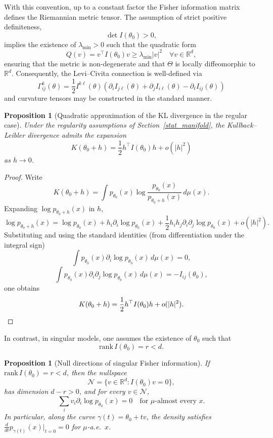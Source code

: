 \documentclass[11pt,letterpaper]{amsart}
\numberwithin{equation}{section}
\theoremstyle{plain}
\newtheorem{proposition}[theorem]{Proposition}
\theoremstyle{definition}
\theoremstyle{remark}
\begin{document}
With this convention, up to a constant factor the Fisher information matrix defines the Riemannian metric tensor. The assumption of strict positive definiteness,
\[
\det I(\theta_0) > 0,
\]
implies the existence of $\lambda_{\min} > 0$ such that the quadratic form
\[
Q(v) = v^\top I(\theta_0) v \geq \lambda_{\min} |v|^2 \quad \forall v \in \mathbb{R}^d,
\]
ensuring that the metric is non-degenerate and that $\Theta$ is locally diffeomorphic to $\mathbb{R}^d$. Consequently, the Levi--Civita connection is well-defined via
\[
\Gamma^k_{ij}(\theta)
=
\frac{1}{2} I^{k\ell}(\theta)
\left(
\partial_i I_{j\ell}(\theta)
+
\partial_j I_{i\ell}(\theta)
-
\partial_\ell I_{ij}(\theta)
\right)
\]
and curvature tensors may be constructed in the standard manner.

\begin{proposition}[Quadratic approximation of the KL divergence in the regular case]
\label{prop:KL_regular}
Under the regularity assumptions of Section~\ref{stat_manifold}, the Kullback--Leibler divergence admits the expansion
\[
K(\theta_0 + h) = \frac{1}{2} h^\top I(\theta_0) h + o(|h|^2)
\]
as $h \to 0$.
\end{proposition}

\begin{proof}
Write
\[
K(\theta_0 + h)
=
\int p_{\theta_0}(x)
\log \frac{p_{\theta_0}(x)}{p_{\theta_0 + h}(x)} \, d\mu(x).
\]
Expanding $\log p_{\theta_0 + h}(x)$ in $h$,
\[
\log p_{\theta_0 + h}(x)
=
\log p_{\theta_0}(x)
+
h_i \partial_i \log p_{\theta_0}(x)
+
\frac{1}{2} h_i h_j \partial_i \partial_j \log p_{\theta_0}(x)
+
o(|h|^2).
\]
Substituting and using the standard identities (from differentiation under the integral sign)
\[
\int p_{\theta_0}(x) \partial_i \log p_{\theta_0}(x) \, d\mu(x) = 0,
\]
\[
\int p_{\theta_0}(x) \partial_i \partial_j \log p_{\theta_0}(x) \, d\mu(x)
= -I_{ij}(\theta_0),
\]
one obtains
\[
K(\theta_0 + h) = \frac{1}{2} h^\top I(\theta_0) h + o(|h|^2). \qedhere
\]
\end{proof}

In contrast, in singular models, one assumes the existence of $\theta_0$ such that
\[
\mathrm{rank}\, I(\theta_0) = r < d.
\]

\begin{proposition}[Null directions of singular Fisher information]
\label{prop:null_directions}
If $\mathrm{rank}\,I(\theta_0) = r < d$, then the nullspace
\[
\mathcal{N} = \{ v \in \mathbb{R}^d : I(\theta_0) v = 0 \},
\]
has dimension $d-r>0$, and for every $v \in \mathcal{N}$,
\[
\sum_i v_i \partial_i \log p_{\theta_0}(x) = 0 \quad \text{for } \mu\text{-almost every } x.
\]
In particular, along the curve $\gamma(t) = \theta_0 + tv$, the density satisfies $\frac{d}{dt}p_{\gamma(t)}(x)\big|_{t=0} = 0$ for $\mu$-a.e.\ $x$.
\end{proposition}
\end{document}
